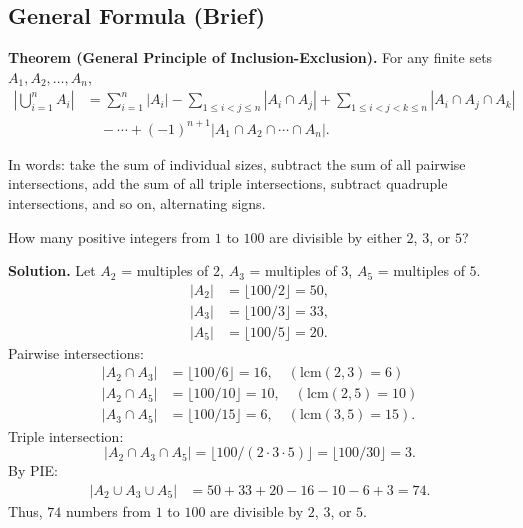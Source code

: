 \documentclass[11pt,a4paper]{article}
\begin{document}
\subsection{General Formula (Brief)}

\textbf{Theorem (General Principle of Inclusion-Exclusion).} For any finite sets $A_1, A_2, \dots, A_n$,
\begin{align*}
    \left| \bigcup_{i=1}^{n} A_i \right| &= \sum_{i=1}^{n} |A_i| - \sum_{1 \leq i < j \leq n} |A_i \cap A_j| + \sum_{1 \leq i < j < k \leq n} |A_i \cap A_j \cap A_k| \\
    &\quad - \cdots + (-1)^{n+1} |A_1 \cap A_2 \cap \cdots \cap A_n|.
\end{align*}

In words: take the sum of individual sizes, subtract the sum of all pairwise intersections, add the sum of all triple intersections, subtract quadruple intersections, and so on, alternating signs.

\begin{example}
How many positive integers from $1$ to $100$ are divisible by either $2$, $3$, or $5$?

\textbf{Solution.} Let $A_2$ = multiples of $2$, $A_3$ = multiples of $3$, $A_5$ = multiples of $5$.
\begin{align*}
    |A_2| &= \lfloor 100/2 \rfloor = 50, \\
    |A_3| &= \lfloor 100/3 \rfloor = 33, \\
    |A_5| &= \lfloor 100/5 \rfloor = 20.
\end{align*}
Pairwise intersections:
\begin{align*}
    |A_2 \cap A_3| &= \lfloor 100/6 \rfloor = 16, \quad (\text{lcm}(2,3)=6) \\
    |A_2 \cap A_5| &= \lfloor 100/10 \rfloor = 10, \quad (\text{lcm}(2,5)=10) \\
    |A_3 \cap A_5| &= \lfloor 100/15 \rfloor = 6, \quad (\text{lcm}(3,5)=15).
\end{align*}
Triple intersection:
\begin{equation*}
    |A_2 \cap A_3 \cap A_5| = \lfloor 100/(2\cdot 3\cdot 5) \rfloor = \lfloor 100/30 \rfloor = 3.
\end{equation*}
By PIE:
\begin{align*}
    |A_2 \cup A_3 \cup A_5| &= 50 + 33 + 20 - 16 - 10 - 6 + 3 = 74.
\end{align*}
Thus, $74$ numbers from $1$ to $100$ are divisible by $2$, $3$, or $5$.
\end{example}
\end{document}
